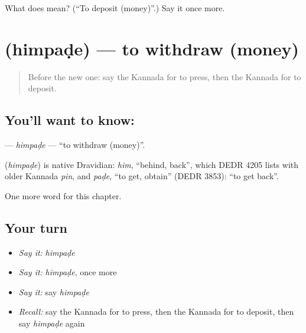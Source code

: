 \begin{tcolorbox}[breakable,colback=teal!4,colframe=teal!35!black,title={Before you move on}]
What does   mean? (\textquotedblleft{}To deposit (money)\textquotedblright{}.) Say it once more.
\end{tcolorbox}
\section[\texorpdfstring{\kn{ಹಿಂಪಡೆ} (himpaḍe)}{ಹಿಂಪಡೆ (himpaḍe)}]{ (himpaḍe) — to withdraw (money)}

\label{lesson:KA-C274-himpade}



\begin{quote}
Before the new one: say the Kannada for to press, then the Kannada for to deposit.
\end{quote}

\subsection*{You'll want to know: }
\textbf{} — \emph{himpaḍe} — \textquotedblleft{}to withdraw (money)\textquotedblright{}.

\begin{cousinweb}
\textbf{} (\emph{himpaḍe}) is native Dravidian: \emph{him}, \textquotedblleft{}behind, back\textquotedblright{}, which DEDR 4205 lists with older Kannada \emph{pin}, and \emph{paḍe}, \textquotedblleft{}to get, obtain\textquotedblright{} (DEDR 3853): \textquotedblleft{}to get back\textquotedblright{}.
\end{cousinweb}

\begin{grammarlens}[title={What you've built}]
One more word for this chapter.
\end{grammarlens}

\subsection*{Your turn}
\begin{itemize}
\raggedright
  \item \emph{Say it:} \emph{himpaḍe}
  \item \emph{Say it:} \emph{himpaḍe}, once more
  \item \emph{Say it:} say \emph{himpaḍe}
  \item \emph{Recall:} say the Kannada for to press, then the Kannada for to deposit, then say \emph{himpaḍe} again
\end{itemize}


